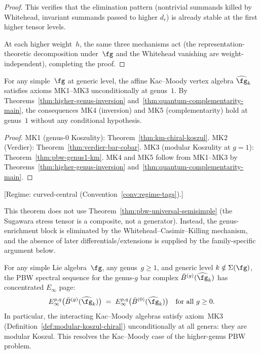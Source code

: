 \begin{proof}
This verifies that the elimination pattern (nontrivial
summands killed by Whitehead, invariant summands passed to
higher $d_r$) is already stable at the first higher tensor
levels.

At each higher weight~$h$, the same
three mechanisms act (the representation-theoretic
decomposition under~$\fg$ and the Whitehead vanishing
are weight-independent), completing the proof.
\end{proof}

\begin{corollary}
\label{cor:unconditional-genus1-km}
For any simple~$\fg$ at generic level, the affine
Kac--Moody vertex algebra $\widehat{\fg}_k$ satisfies
axioms \textup{MK1--MK3} unconditionally at genus~$1$.
By Theorems~\textup{\ref{thm:higher-genus-inversion}}
and~\textup{\ref{thm:quantum-complementarity-main}},
the consequences \textup{MK4} \textup{(}inversion\textup{)}
and \textup{MK5} \textup{(}complementarity\textup{)} hold
at genus~$1$ without any conditional hypothesis.
\end{corollary}

\begin{proof}
MK1 (genus-$0$ Koszulity):
Theorem~\ref{thm:km-chiral-koszul}.
MK2 (Verdier):
Theorem~\ref{thm:verdier-bar-cobar}.
MK3 (modular Koszulity at $g = 1$):
Theorem~\ref{thm:pbw-genus1-km}.
MK4 and MK5 follow from MK1--MK3 by
Theorems~\ref{thm:higher-genus-inversion}
and~\ref{thm:quantum-complementarity-main}.
\end{proof}

\begin{theorem}
\label{thm:pbw-allgenera-km}
\textup{[Regime: curved-central
\textup{(}Convention~\textup{\ref{conv:regime-tags})}.]}

This theorem does not use Theorem~\ref{thm:pbw-universal-semisimple}
\textup{(}the Sugawara stress tensor is a composite, not a generator\textup{)}.
Instead, the genus-enrichment block is eliminated by the Whitehead--Casimir--Killing
mechanism, and the absence of later differentials/extensions is supplied by the
family-specific argument below.

For any simple Lie algebra~$\fg$, any genus~$g \geq 1$, and
generic level $k \notin \Sigma(\fg)$, the PBW spectral sequence
for the genus-$g$ bar complex
$\bar{B}^{(g)}(\widehat{\fg}_k)$ has concentrated
$E_\infty$ page:
\[
E_\infty^{p,q}\bigl(\bar{B}^{(g)}(\widehat{\fg}_k)\bigr)
\;=\;
E_\infty^{p,q}\bigl(\bar{B}^{(0)}(\widehat{\fg}_k)\bigr)
\quad \text{for all } g \geq 0.
\]
In particular, the interacting Kac--Moody algebras satisfy
axiom~\textup{MK3}
\textup{(}Definition~\textup{\ref{def:modular-koszul-chiral})}
unconditionally at all genera:
they are modular Koszul.  This resolves the
Kac--Moody case of the higher-genus PBW problem.
\end{theorem}

